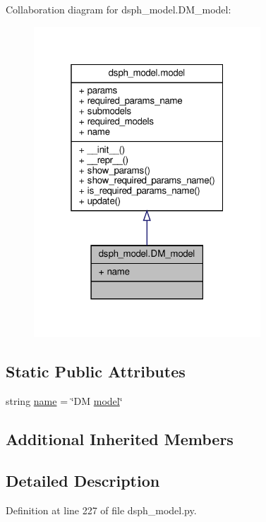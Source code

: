 Collaboration diagram for dsph\+\_\+model.\+D\+M\+\_\+model\+:\nopagebreak
\begin{figure}[H]
\begin{center}
\leavevmode
\includegraphics[width=241pt]{df/d4f/classdsph__model_1_1DM__model__coll__graph}
\end{center}
\end{figure}
\subsection*{Static Public Attributes}
\begin{DoxyCompactItemize}
\item 
string \hyperlink{classdsph__model_1_1DM__model_adb4289b632a2ad76991047f359e9d649}{name} = \char`\"{}DM \hyperlink{classdsph__model_1_1model}{model}\char`\"{}
\end{DoxyCompactItemize}
\subsection*{Additional Inherited Members}


\subsection{Detailed Description}


Definition at line 227 of file dsph\+\_\+model.\+py.



